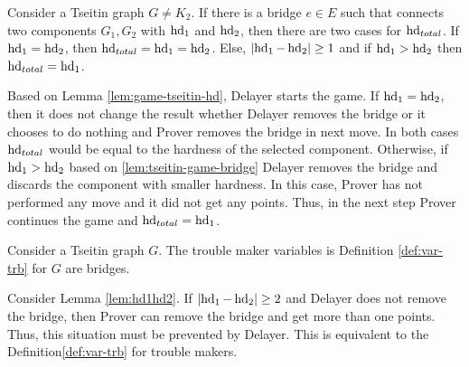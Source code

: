 \documentclass{report}
\begin{document}
\begin{lem}\label{lem:hd1hd2}
Consider a Tseitin graph $G \not = K_2$. If there is a bridge $e \in E$ such that connects two components $G_1,G_2$ with $\operatorname{hd}_1$ and $\operatorname{hd}_2$, then there are two cases for $\operatorname{hd}_{total}$. If $\operatorname{hd}_1= \operatorname{hd}_2$, then $\operatorname{hd}_{total}= \operatorname{hd}_1= \operatorname{hd}_2$. Else, $ \lvert \operatorname{hd}_1- \operatorname{hd}_2  \rvert \geq 1$ and if $ \operatorname{hd}_1 > \operatorname{hd}_2 $  then $\operatorname{hd}_{total}= \operatorname{hd}_1$.
\end{lem}	
\begin{prf}
Based on Lemma \ref{lem:game-tseitin-hd}, Delayer starts the game. If $\operatorname{hd}_1= \operatorname{hd}_2$, then it does not change the result whether Delayer removes the bridge or it chooses to do nothing and Prover removes the bridge in next move. In both cases $\operatorname{hd}_{total}$ would be equal to the hardness of the selected component. Otherwise, if $ \operatorname{hd}_1 > \operatorname{hd}_2 $ based on \ref{lem:tseitin-game-bridge} Delayer removes the bridge and discards the  component with smaller hardness. In this case, Prover has not performed any move and it did not get any points. Thus, in the next step Prover continues the game and  $\operatorname{hd}_{total}= \operatorname{hd}_1$.
\end{prf}

\begin{lem}\label{lem:troubllemk-hd}
Consider a Tseitin graph $G$. The trouble maker variables is Definition \ref{def:var-trb} for $G$ are bridges.
\end{lem}
\begin{prf}
Consider Lemma \ref{lem:hd1hd2}. If $ \lvert \operatorname{hd}_1- \operatorname{hd}_2  \rvert \geq 2$ and Delayer does not remove the bridge, then Prover can remove the bridge and get more than one points. Thus, this situation must be prevented by Delayer. This is equivalent to the Definition\ref{def:var-trb} for trouble makers.
\end{prf}
\end{document}
